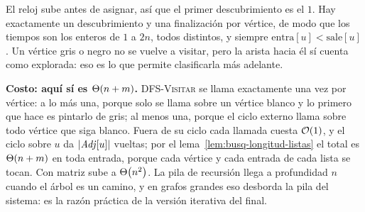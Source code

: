 \documentclass[11pt,letterpaper]{article}
\begin{document}
El reloj sube antes de asignar, así que el primer descubrimiento es el
$1$. Hay exactamente un descubrimiento y una finalización por vértice,
de modo que los tiempos son los enteros de $1$ a $2n$, todos
distintos, y siempre $\text{entra}[u] < \text{sale}[u]$. Un vértice
gris o negro no se vuelve a visitar, pero la arista hacia él sí cuenta
como explorada: eso es lo que permite clasificarla más adelante.

\textbf{Costo: aquí sí es $\Theta\!\left(n + m\right)$.} \textsc{DFS-Visitar} se
llama exactamente una vez por vértice: a lo más una, porque solo se
llama sobre un vértice blanco y lo primero que hace es pintarlo de
gris; al menos una, porque el ciclo externo llama sobre todo vértice
que siga blanco. Fuera de su ciclo cada llamada cuesta $\mathcal{O}\!\left(1\right)$, y el
ciclo sobre $u$ da $\left\lvert \mathit{Adj}[u] \right\rvert$ vueltas; por el
lema~\ref{lem:busq-longitud-listas} el total es $\Theta\!\left(n + m\right)$ en toda
entrada, porque cada vértice y cada entrada de cada lista se tocan.
Con matriz sube a $\Theta\!\left(n^2\right)$. La pila de recursión llega a
profundidad $n$ cuando el árbol es un camino, y en grafos grandes eso
desborda la pila del sistema: es la razón práctica de la versión
iterativa del final.
\end{document}
